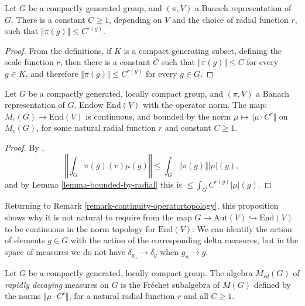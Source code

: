 \begin{lemma}
\label{lemma-bounded-by-radial}
Let $G$ be a compactly generated group, and $(\pi,V)$ a Banach representation of $G$.
There is a constant $C\ge 1$, depending on $V$ and the choice of radial function $r$, such that $\Vert \pi(g)\Vert \le C^{r(g)}$.
\end{lemma}

\begin{proof}
 From the definitions, if $K$ is a compact generating subset, defining the scale function $r$, then there is a constant $C$ such that $\Vert\pi(g)\Vert \le C$ for every $g\in K$, and therefore $\Vert\pi(g)\Vert \le C^{r(g)}$ for every $g\in G$.
\end{proof}

\begin{proposition}
\label{proposition-integral-Banach}
Let $G$ be a compactly generated, locally compact group, and $(\pi, V)$ a Banach representation of $G$. Endow $\text{End}(V)$ with the operator norm. The map: $M_c(G)\to \text{End}(V)$ is continuous, and bounded by the norm $\mu\mapsto \Vert \mu \cdot C^r\Vert$ on $M_c(G)$, for some natural radial function $r$ and constant $C \ge 1$.
\end{proposition}

\begin{proof}
 By \cite[Theorem 3.29]{Rudin}, 
 $$
 \left\Vert \int_G \pi(g)(v) \mu(g)\right\Vert \le \int_G \Vert \pi(g)\Vert |\mu|(g),
 $$
 and by Lemma \ref{lemma-bounded-by-radial} this is $\le \int_G C^{r(g)} |\mu|(g)$. 
\end{proof}


\begin{remark}
\label{remark-continuity-algebras}
Returning to Remark \ref{remark-continuity-operatortopology},  this proposition shows why it is not natural to require from the map $G\to \text{Aut}(V)\hookrightarrow \text{End}(V)$ to be continuous in the norm topology for $\text{End}(V)$: We can identify the action of elements $g\in G$ with the action of the corresponding delta measures, but in the space of measures we do not have $\delta_{g_n}\to \delta_g$ when $g_n\to g$.
\end{remark}


\begin{definition}
\label{definition-rapidly-decaying}
 Let $G$ be a compactly generated, locally compact group. The algebra $M_{rd}(G)$ of {\it rapidly decaying} measures on $G$ is the Fr\'echet subalgebra of $M(G)$ defined by the norms $\Vert \mu \cdot C^r\Vert$, for a natural radial function $r$ and all $C \ge 1$. 
\end{definition}

